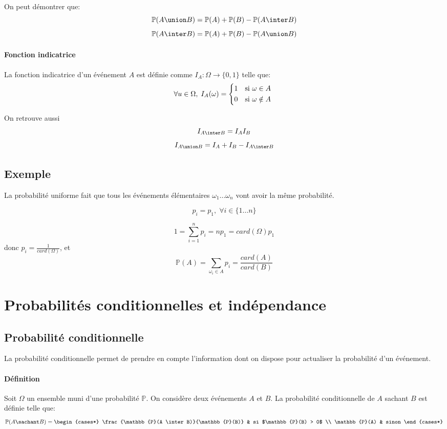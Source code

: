 \documentclass[a4paper,10pt,french,openany]{memoir}
\newcommand{\Proba}{\mathbb{P}}
\begin{document}
On peut démontrer que:
\[ \Proba(A \union B) = \Proba(A) + \Proba(B) - \Proba(A \inter B) \]
\[ \Proba(A \inter B) = \Proba(A) + \Proba(B) - \Proba(A \union B) \]

\paragraph{Fonction indicatrice} La fonction indicatrice d'un événement $A$ est définie comme
$ I_A: \Omega \rightarrow \lbrace 0, 1 \rbrace $
telle que:
\[
\forall u \in \Omega, \; I_A(\omega) = \begin{cases*}
1 & si $\omega \in A$ \\ 
0 & si $\omega \notin A$
\end{cases*}
\]

On retrouve aussi
\[I_{A \inter B} = I_A I_B\]
\[I_{A \union B} = I_A + I_B - I_{A \inter B}\]

\subsection{Exemple}

La probabilité uniforme fait que tous les événements élémentaires $\omega_1\dots\omega_n$ vont avoir la même probabilité.

\[ p_i = p_1, \; \forall i \in \lbrace 1 \dots n \rbrace \]

\[ 1 = \sum_{i=1}^n p_i = n p_1 = card(\Omega) p_1 \]
donc $p_i = \frac{1}{card(\Omega)}$, et
\[ \Proba(A) = \sum_{\omega_i \in A} p_i = \frac{card(A)}{card(B)} \]

\section{Probabilités conditionnelles et indépendance}
\subsection{Probabilité conditionnelle}

La probabilité conditionnelle permet de prendre en compte l'information dont on dispose pour actualiser la probabilité d'un événement.

\paragraph{Définition}
Soit $\Omega$ un ensemble muni d'une probabilité $\Proba$. On considère deux événements $A$ et $B$. La probabilité conditionnelle de $A$ sachant $B$ est définie telle que:
\[
\Proba(A \sachant B) =
    \begin{cases*}
        \frac{\Proba(A \inter B)}{\Proba(B)} & si $\Proba(B) > 0$ \\
        \Proba(A) & sinon
    \end{cases*}
\]
\end{document}
